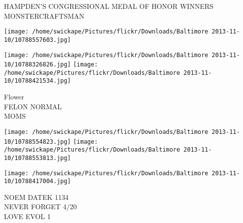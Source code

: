 \documentclass[10pt,letterpaper]{article}
\begin{document}
HAMPDEN'S CONGRESSIONAL MEDAL OF HONOR WINNERS\\
MONSTERCRAFTSMAN\\
\pagebreak

\texttt{[image: /home/swickape/Pictures/flickr/Downloads/Baltimore 2013-11-10/10788557603.jpg]}

\vspace{0.25in}
\texttt{[image: /home/swickape/Pictures/flickr/Downloads/Baltimore 2013-11-10/10788326826.jpg]}
\texttt{[image: /home/swickape/Pictures/flickr/Downloads/Baltimore 2013-11-10/10788421534.jpg]}

Flower\\
FELON NORMAL\\
MOMS\\
\pagebreak

\texttt{[image: /home/swickape/Pictures/flickr/Downloads/Baltimore 2013-11-10/10788554823.jpg]}
\texttt{[image: /home/swickape/Pictures/flickr/Downloads/Baltimore 2013-11-10/10788553813.jpg]}

\texttt{[image: /home/swickape/Pictures/flickr/Downloads/Baltimore 2013-11-10/10788417004.jpg]}

NOEM DATEK 1134\\
NEVER FORGET 4/20\\
LOVE EVOL 1\\
\pagebreak
\end{document}
